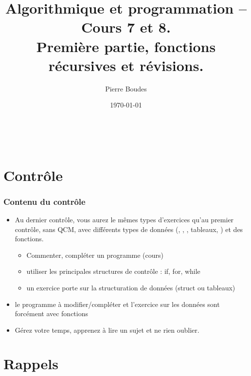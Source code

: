 \documentclass[xcolor=svgnames]{beamer}
\title{Algorithmique et programmation -- Cours 7 et 8.\\ Première partie, fonctions récursives et révisions.}
\author{Pierre Boudes}
\date{\today}
\begin{document}
\begin{frame}
        \titlepage
        \vfill
        \begin{center}
                \\[2.5ex]
                {\tiny\CcNote{\CcLongnameByNcSa}}
                \vspace*{-2.5ex}
        \end{center}
\end{frame}


\section[Plan]{}
\frame[label=plan]{\tableofcontents}



\section{Contrôle}
\begin{frame}
  \frametitle{Contenu du contrôle}
  \begin{itemize}
  \item Au dernier contrôle, vous aurez le mêmes types
    d'exercices qu'au premier contrôle, sans QCM, avec différents types de données
    (, , , tableaux, ) et des fonctions.
\begin{itemize}
\item Commenter, compléter un programme (cours)
\item utiliser les principales structures de contrôle : if, for, while
\item un exercice porte sur la structuration de données (struct ou tableaux)
\end{itemize}
\item le programme à modifier/compléter et l'exercice sur les données sont forcément avec fonctions
 \item
\alert{Gérez votre temps, apprenez à lire un sujet et ne rien oublier.} 
 \end{itemize}
\end{frame}

\section{Rappels}
\end{document}

